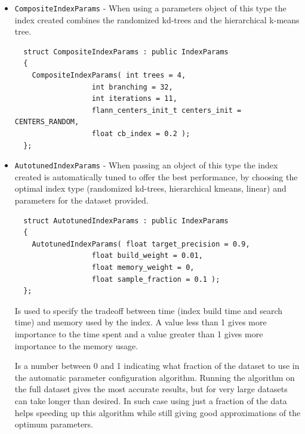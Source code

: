 \begin {itemize}
 \item \texttt{CompositeIndexParams} - When using a parameters object of this type the index created combines the randomized kd-trees 
	and the hierarchical k-means tree.
\begin{lstlisting}
  struct CompositeIndexParams : public IndexParams 
  {
	CompositeIndexParams( int trees = 4, 
			      int branching = 32, 
			      int iterations = 11,
			      flann_centers_init_t centers_init = CENTERS_RANDOM, 
			      float cb_index = 0.2 );
  };
\end{lstlisting}

 \item \texttt{AutotunedIndexParams} - When passing an object of this type the index created is automatically tuned to offer 
the best performance, by choosing the optimal index type (randomized kd-trees, hierarchical kmeans, linear) and parameters for the
dataset provided.
\begin{lstlisting}
  struct AutotunedIndexParams : public IndexParams 
  {
	AutotunedIndexParams( float target_precision = 0.9, 
			      float build_weight = 0.01,
			      float memory_weight = 0, 
			      float sample_fraction = 0.1 );
  };
\end{lstlisting}
\begin{description}


 {Is used to specify the tradeoff between
time (index build time and search time) and memory used by the index. A
value less than 1 gives more importance to the time spent and a value
greater than 1 gives more importance to the memory usage.}

 {Is a number between 0 and 1 indicating what fraction
of the dataset to use in the automatic parameter configuration algorithm. Running the 
algorithm on the full dataset gives the most accurate results, but for
very large datasets can take longer than desired. In such case using just a fraction of the
data helps speeding up this algorithm while still giving good approximations of the
optimum parameters.}
\end{description}


\end{itemize}
